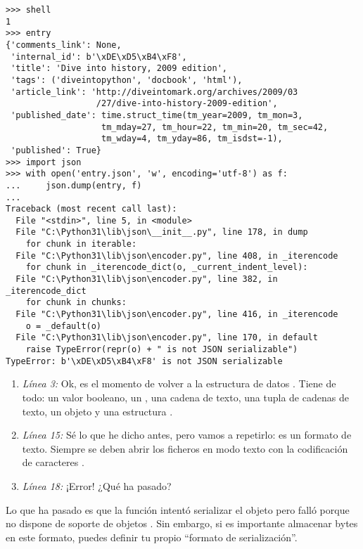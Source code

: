 \noindent\begin{minipage}{\textwidth}
\begin{lstlisting}[mathescape=True]
>>> shell
1
>>> entry
{'comments_link': None,
 'internal_id': b'\xDE\xD5\xB4\xF8',
 'title': 'Dive into history, 2009 edition',
 'tags': ('diveintopython', 'docbook', 'html'),
 'article_link': 'http://diveintomark.org/archives/2009/03
                  /27/dive-into-history-2009-edition',
 'published_date': time.struct_time(tm_year=2009, tm_mon=3, 
                   tm_mday=27, tm_hour=22, tm_min=20, tm_sec=42, 
                   tm_wday=4, tm_yday=86, tm_isdst=-1),
 'published': True}
>>> import json
>>> with open('entry.json', 'w', encoding='utf-8') as f:
...     json.dump(entry, f)
... 
Traceback (most recent call last):
  File "<stdin>", line 5, in <module>
  File "C:\Python31\lib\json\__init__.py", line 178, in dump
    for chunk in iterable:
  File "C:\Python31\lib\json\encoder.py", line 408, in _iterencode
    for chunk in _iterencode_dict(o, _current_indent_level):
  File "C:\Python31\lib\json\encoder.py", line 382, in _iterencode_dict
    for chunk in chunks:
  File "C:\Python31\lib\json\encoder.py", line 416, in _iterencode
    o = _default(o)
  File "C:\Python31\lib\json\encoder.py", line 170, in default
    raise TypeError(repr(o) + " is not JSON serializable")
TypeError: b'\xDE\xD5\xB4\xF8' is not JSON serializable
\end{lstlisting}
\end{minipage}

\begin{enumerate}

\item \emph{Línea 3:} Ok, es el momento de volver a la estructura de datos . Tiene de todo: un valor booleano, un , una cadena de texto, una tupla de cadenas de texto, un objeto  y una estructura .

\item \emph{Línea 15:} Sé lo que he dicho antes, pero vamos a repetirlo:  es un formato de texto. Siempre se deben abrir los ficheros  en modo texto con la codificación de caracteres .

\item \emph{Línea 18:} ¡Error! ¿Qué ha pasado?

\end{enumerate}

Lo que ha pasado es que la función  intentó serializar el objeto  pero falló porque  no dispone de soporte de objetos . Sin embargo, si es importante almacenar bytes en este formato, puedes definir tu propio ``formato de serialización''.

